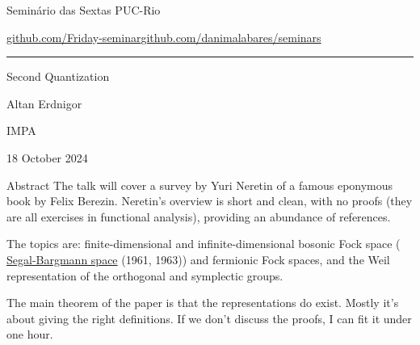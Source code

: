 


\begin{minipage}{\textwidth}
	\begin{minipage}{1\textwidth}
		Semin\'ario das Sextas \hfill PUC-Rio
		
		{\small\href{https://github.com/Friday-seminar/}{github.com/Friday-seminar}\hfill\href{https://github.com/danimalabares/seminars}{github.com/danimalabares/seminars}}
		\end{minipage}
\end{minipage}\vspace{.2cm}\hrule

\vspace{10pt}

{\Huge Second Quantization}

\hfill{\Large Altan Erdnigor}

\hfill{\Large IMPA}

\hfill{\large 18 October 2024}
\begin{thing7}{Abstract}\leavevmode
	The talk will cover a survey by Yuri Neretin of a famous eponymous book by Felix Berezin. Neretin's overview is short and clean, with no proofs (they are all exercises in functional analysis), providing an abundance of references.

	The topics are: finite-dimensional and infinite-dimensional bosonic Fock space ( \href{https://en.wikipedia.org/wiki/Segal%E2%80%93Bargmann_space}{Segal-Bargmann space} (1961, 1963)) and fermionic Fock spaces, and the Weil representation of the orthogonal and symplectic groups.

The main theorem of the paper is that the representations do exist. Mostly it's about giving the right definitions. If we don't discuss the proofs, I can fit it under one hour.
\end{thing7}

\tableofcontents


